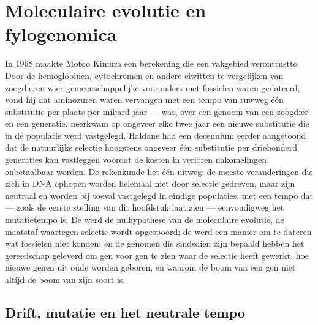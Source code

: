 \chapter{Moleculaire evolutie en fylogenomica}\label{ch:b3:molecular-evolution}

In 1968 maakte Motoo Kimura een berekening die een vakgebied
verontrustte. Door de hemoglobinen, cytochromen en andere eiwitten te
vergelijken van zoogdieren wier gemeenschappelijke voorouders met
fossielen waren gedateerd, vond hij dat aminozuren waren vervangen met
een tempo van ruwweg één substitutie per plaats per miljard jaar ---
wat, over een genoom van een zoogdier en een generatie, neerkwam op
ongeveer elke twee jaar een nieuwe substitutie die in de populatie werd
vastgelegd. Haldane had een decennium eerder aangetoond dat de
natuurlijke selectie hoogstens ongeveer één substitutie per driehonderd
generaties kan vastleggen voordat de kosten in verloren nakomelingen
onbetaalbaar worden. De rekenkunde liet één uitweg: de meeste
veranderingen die zich in DNA ophopen worden helemaal niet door
selectie gedreven, maar zijn neutraal en worden bij toeval vastgelegd
in eindige populaties, met een tempo dat --- zoals de eerste stelling
van dit hoofdstuk laat zien --- eenvoudigweg het mutatietempo is. De
 werd de nulhypothese van de moleculaire evolutie, de
maatstaf waartegen selectie wordt opgespoord; de  werd
een manier om te dateren wat fossielen niet konden; en de genomen die
sindsdien zijn bepaald hebben het gereedschap geleverd om gen voor gen
te zien waar de selectie heeft gewerkt, hoe nieuwe genen uit oude
worden geboren, en waarom de boom van een gen niet altijd de boom van
zijn soort is.

\section{Drift, mutatie en het neutrale tempo}

